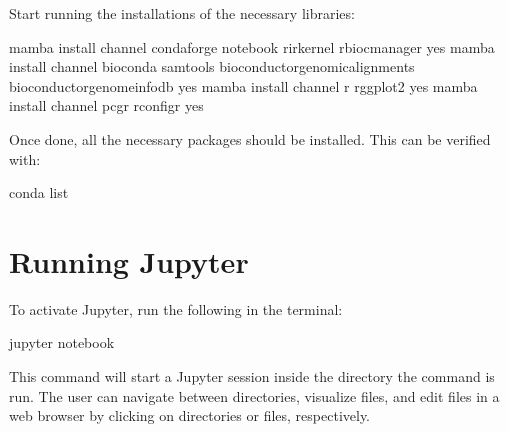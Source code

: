 \documentclass[letterpaper,10pt,english]{sphinxhowto}
\begin{document}
\sphinxAtStartPar
Start running the installations of the necessary libraries:

\begin{sphinxVerbatim}[commandchars=\\\{\}]
\PYGZdl{} mamba install \PYGZhy{}\PYGZhy{}channel conda\PYGZhy{}forge notebook r\PYGZhy{}irkernel r\PYGZhy{}biocmanager \PYGZhy{}\PYGZhy{}yes
\PYGZdl{} mamba install \PYGZhy{}\PYGZhy{}channel bioconda samtools bioconductor\PYGZhy{}genomicalignments bioconductor\PYGZhy{}genomeinfodb \PYGZhy{}\PYGZhy{}yes
\PYGZdl{} mamba install \PYGZhy{}\PYGZhy{}channel r r\PYGZhy{}ggplot2 \PYGZhy{}\PYGZhy{}yes
\PYGZdl{} mamba install \PYGZhy{}\PYGZhy{}channel pcgr r\PYGZhy{}configr \PYGZhy{}\PYGZhy{}yes
\end{sphinxVerbatim}

\sphinxAtStartPar
Once done, all the necessary packages should be installed. This can be verified with:

\begin{sphinxVerbatim}[commandchars=\\\{\}]
\PYGZdl{} conda list
\end{sphinxVerbatim}


\section{Running Jupyter}
\label{\detokenize{index:running-jupyter}}
\sphinxAtStartPar
To activate Jupyter, run the following in the terminal:

\begin{sphinxVerbatim}[commandchars=\\\{\}]
\PYGZdl{} jupyter notebook
\end{sphinxVerbatim}

\sphinxAtStartPar
This command will start a Jupyter session inside the directory the command is run. The user can navigate between directories, visualize files, and edit files in a web browser by clicking on directories or files, respectively.
\end{document}
